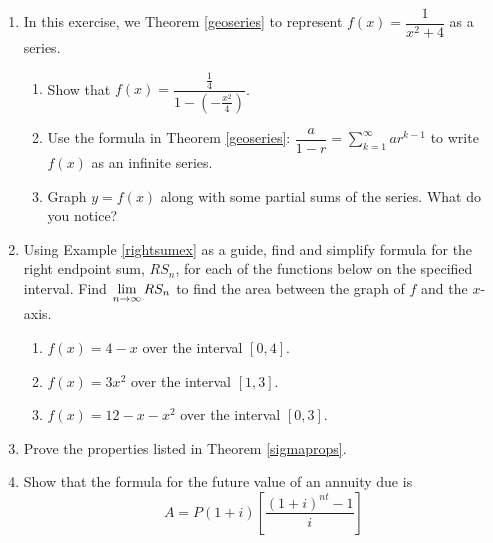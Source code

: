 \begin{enumerate}
\setcounter{enumi}{\value{HW}}

\item\label{seriesforfunctionex}  In this exercise,  we  Theorem \ref{geoseries}  to represent  $f(x) = \dfrac{1}{x^2+4}$ as a series.

\begin{enumerate}

\item  Show that $f(x) = \dfrac{\frac{1}{4}}{1 - \left( -\frac{x^2}{4} \right)}$.

\item  Use the formula  in Theorem \ref{geoseries}: $\dfrac{a}{1-r} = \displaystyle{\sum_{k=1}^{\infty} ar^{k-1}}$ to write $f(x)$ as an infinite series.

\item Graph $y = f(x)$ along with some partial sums of the series.  What do you notice?


\end{enumerate}



\item  Using Example \ref{rightsumex} as a guide, find and simplify  formula for the right endpoint sum, $RS_{n}$, for each of the functions below on the specified interval.  Find $\displaystyle{\lim_{n \rightarrow \infty} RS_{n}}$ to find the area between the graph of $f$ and the $x$-axis.


\begin{enumerate}

\item  $f(x) = 4-x$ over the interval $[0,4]$.   %

\item  $f(x) = 3x^2$ over the interval $[1,3]$.    %

\item  $f(x) = 12-x-x^2$ over the interval $[0,3]$.   %


\end{enumerate}




\item Prove the properties listed in Theorem \ref{sigmaprops}.

\item Show that the formula for the future value of an annuity due is \[A = P(1 + i)\left[\frac{(1 + i)^{nt} - 1}{i}\right]\]


\newpage


\end{enumerate}
